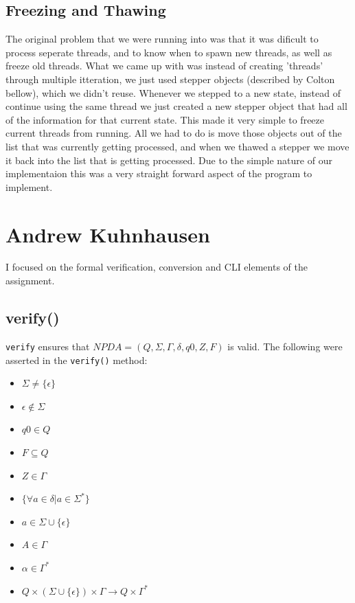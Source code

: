 \documentclass[a4paper]{article}
\begin{document}
\subsection{Freezing and Thawing}
The original problem that we were running into was that it was dificult to process
seperate threads, and to know when to spawn new threads, as well as freeze old threads.
What we came up with was instead of creating 'threads' through multiple itteration, we just
used stepper objects (described by Colton bellow), which we didn't reuse. Whenever we
stepped to a new state, instead of continue using the same thread we just created a new
stepper object that had all of the information for that current state. This made it
very simple to freeze current threads from running. All we had to do is move those
objects out of the list that was currently getting processed, and when we thawed a
stepper we move it back into the list that is getting processed. Due to the simple
nature of our implementaion this was a very straight forward aspect of the program
to implement.
\section{Andrew Kuhnhausen}
I focused on the formal verification, conversion and CLI elements of the
assignment.
\subsection{verify()}
\texttt{verify} ensures that $NPDA=(Q,\Sigma,\Gamma,\delta,q0,Z,F)$ is valid.
The following were asserted in the \texttt{verify()} method:
\begin{itemize}
    \item $\Sigma \ne \{\epsilon\}$
    \item $\epsilon \notin \Sigma$
    \item $q0\in Q$
    \item $F \subseteq Q$
    \item $Z \in \Gamma$
    \item $\{\forall a \in \delta | a \in \Sigma^{*}\}$
    \item $a\in\Sigma\cup\{\epsilon\}$
    \item $A\in\Gamma$
    \item $\alpha\in\Gamma^{*}$
    \item $Q\times(\Sigma\cup\{\epsilon\})\times\Gamma\rightarrow Q\times\Gamma^{*}$
\end{itemize}
\end{document}
